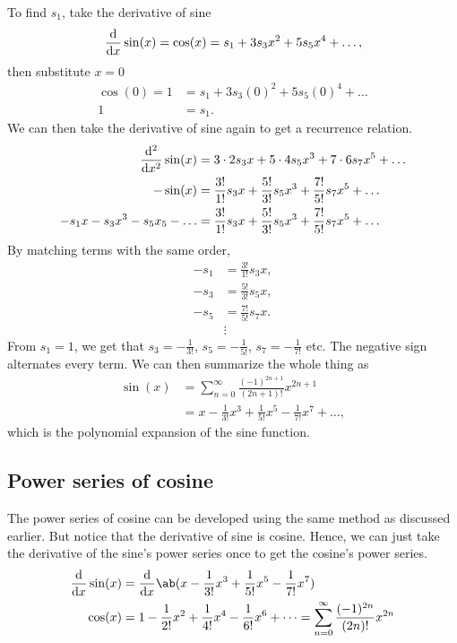 To find $s_1$, take the derivative of sine
\begin{equation}
	\odv*{\sin(x)}{x} = \cos(x) = s_1 + 3s_3x^2 + 5s_5x^4 + \dots,
\end{equation}
then substitute $x = 0$
\begin{align}
	\cos(0) = 1 &= s_1 + 3s_3(0)^2 + 5s_5(0)^4 + \dots \\
	1 &= s_1.
\end{align}
We can then take the derivative of sine again to get a recurrence relation.
\begin{align}
	\odv*[order = 2]{\sin(x)}{x} &= 3\cdot 2s_3x + 5\cdot 4s_5x^3 + 7\cdot 6s_7x^5 + \dots \\
	-\sin(x) &= \frac{3!}{1!}s_3x + \frac{5!}{3!}s_5x^3 + \frac{7!}{5!}s_7x^5 + \dots \\
	-s_1x - s_3x^3 - s_5x_5 - \dots &= \frac{3!}{1!}s_3x + \frac{5!}{3!}s_5x^3 + \frac{7!}{5!}s_7x^5 + \dots
\end{align}
By matching terms with the same order,
\begin{equation}	
	\begin{aligned}
		-s_1 &= \frac{3!}{1!}s_3x, \\
		-s_3 &= \frac{5!}{3!}s_5x, \\
		-s_5 &= \frac{7!}{5!}s_7x. \\
			 &\vdots
	\end{aligned}
\end{equation}
From $s_1 = 1$, we get that $s_3 = -\frac{1}{3!}$, $s_5 = -\frac{1}{5!}$, $s_7 = -\frac{1}{7!}$ etc. The negative sign alternates every term. We can then summarize the whole thing as
\begin{align}
	\sin(x) &= \sum_{n = 0}^{\infty}\frac{(-1)^{2n + 1}}{(2n + 1)!}x^{2n + 1} \\
			&= x - \frac{1}{3!}x^3 + \frac{1}{5!}x^5 - \frac{1}{7!}x^7 + \dots, \label{eq:sine-power-series}
\end{align}
which is the polynomial expansion of the sine function.

\subsection{Power series of cosine}

The power series of cosine can be developed using the same method as discussed earlier. But notice that the derivative of sine is cosine. Hence, we can just take the derivative of the sine's power series once to get the cosine's power series.
\begin{align}
	\odv*{\sin(x)}{x} &= \odv*{\ab(x - \frac{1}{3!}x^3 + \frac{1}{5!}x^5 - \frac{1}{7!}x^7)}{x} \\
	\cos(x) &= 1 - \frac{1}{2!}x^2 + \frac{1}{4!}x^4 - \frac{1}{6!}x^6 + \dots = \sum_{n = 0}^{\infty}\frac{(-1)^{2n}}{(2n)!}x^{2n}\label{eq:cosine-power-series}
\end{align}

